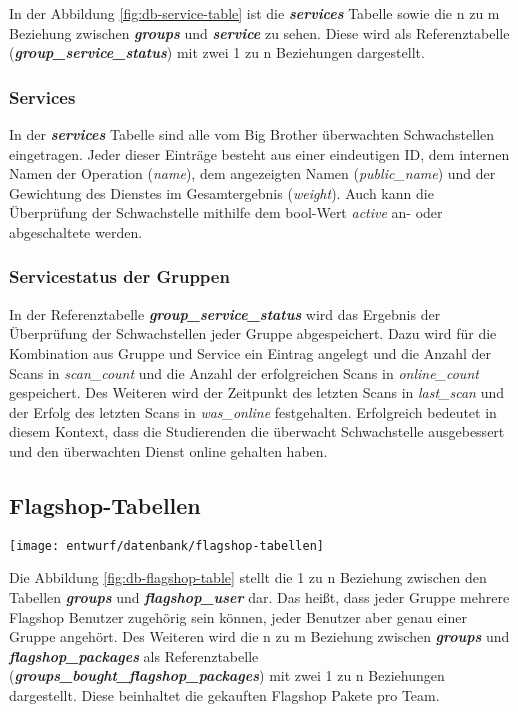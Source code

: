 In der Abbildung \ref{fig:db-service-table} ist die \textbf{\textit{services}} Tabelle sowie die n zu m Beziehung zwischen \textbf{\textit{groups}} und \textbf{\textit{service}} zu sehen. Diese wird als Referenztabelle (\textbf{\textit{group\_service\_status}}) mit zwei 1 zu n Beziehungen dargestellt.

\subsubsection{Services}
In der \textbf{\textit{services}} Tabelle sind alle vom Big Brother überwachten Schwachstellen eingetragen. Jeder dieser Einträge besteht aus einer eindeutigen ID, dem internen Namen der Operation (\textit{name}), dem angezeigten Namen (\textit{public\_name}) und der Gewichtung des Dienstes im Gesamtergebnis (\textit{weight}). Auch kann die Überprüfung der Schwachstelle mithilfe dem bool-Wert \textit{active} an- oder abgeschaltete werden.

\subsubsection{Servicestatus der Gruppen}
In der Referenztabelle \textbf{\textit{group\_service\_status}} wird das Ergebnis der Überprüfung der Schwachstellen jeder Gruppe abgespeichert. Dazu wird für die Kombination aus Gruppe und Service ein Eintrag angelegt und die Anzahl der Scans in \textit{scan\_count} und die Anzahl der erfolgreichen Scans in \textit{online\_count} gespeichert. Des Weiteren wird der Zeitpunkt des letzten Scans in \textit{last\_scan} und der Erfolg des letzten Scans in \textit{was\_online} festgehalten. Erfolgreich bedeutet in diesem Kontext, dass die Studierenden die überwacht Schwachstelle ausgebessert und den überwachten Dienst online gehalten haben.

\subsection{Flagshop-Tabellen}
\begin{center}
	\texttt{[image: entwurf/datenbank/flagshop-tabellen]}
	\label{fig:db-flagshop-table}
\end{center}

Die Abbildung \ref{fig:db-flagshop-table} stellt die 1 zu n Beziehung zwischen den Tabellen \textbf{\textit{groups}} und \textbf{\textit{flagshop\_user}} dar. Das heißt, dass jeder Gruppe mehrere Flagshop Benutzer zugehörig sein können, jeder Benutzer aber genau einer Gruppe angehört. Des Weiteren wird die n zu m Beziehung zwischen \textbf{\textit{groups}} und \textbf{\textit{flagshop\_packages}} als Referenztabelle\\ (\textbf{\textit{groups\_bought\_flagshop\_packages}}) mit zwei 1 zu n Beziehungen dargestellt. Diese beinhaltet die gekauften Flagshop Pakete pro Team.

